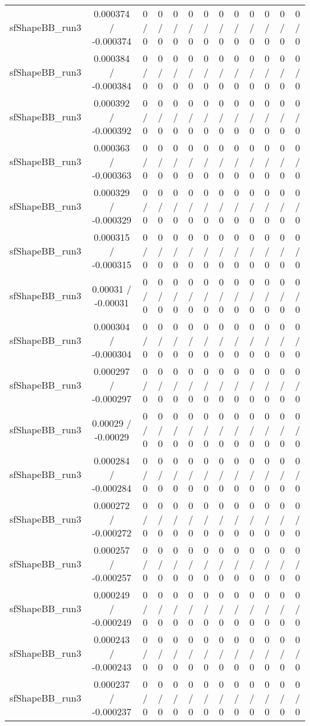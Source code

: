 \documentclass[10pt]{article}
\begin{document}
\begin{table}[htbp]
\begin{center}
\begin{tabular}{|c|c|c|c|c|c|c|c|c|c|c|c|c|}
  sfShapeBB_run3 & 0.000374 / -0.000374 & 0 / 0 & 0 / 0 & 0 / 0 & 0 / 0 & 0 / 0 & 0 / 0 & 0 / 0 & 0 / 0 & 0 / 0 & 0 / 0 & 0 / 0 \\ 
  sfShapeBB_run3 & 0.000384 / -0.000384 & 0 / 0 & 0 / 0 & 0 / 0 & 0 / 0 & 0 / 0 & 0 / 0 & 0 / 0 & 0 / 0 & 0 / 0 & 0 / 0 & 0 / 0 \\ 
  sfShapeBB_run3 & 0.000392 / -0.000392 & 0 / 0 & 0 / 0 & 0 / 0 & 0 / 0 & 0 / 0 & 0 / 0 & 0 / 0 & 0 / 0 & 0 / 0 & 0 / 0 & 0 / 0 \\ 
  sfShapeBB_run3 & 0.000363 / -0.000363 & 0 / 0 & 0 / 0 & 0 / 0 & 0 / 0 & 0 / 0 & 0 / 0 & 0 / 0 & 0 / 0 & 0 / 0 & 0 / 0 & 0 / 0 \\ 
  sfShapeBB_run3 & 0.000329 / -0.000329 & 0 / 0 & 0 / 0 & 0 / 0 & 0 / 0 & 0 / 0 & 0 / 0 & 0 / 0 & 0 / 0 & 0 / 0 & 0 / 0 & 0 / 0 \\ 
  sfShapeBB_run3 & 0.000315 / -0.000315 & 0 / 0 & 0 / 0 & 0 / 0 & 0 / 0 & 0 / 0 & 0 / 0 & 0 / 0 & 0 / 0 & 0 / 0 & 0 / 0 & 0 / 0 \\ 
  sfShapeBB_run3 & 0.00031 / -0.00031 & 0 / 0 & 0 / 0 & 0 / 0 & 0 / 0 & 0 / 0 & 0 / 0 & 0 / 0 & 0 / 0 & 0 / 0 & 0 / 0 & 0 / 0 \\ 
  sfShapeBB_run3 & 0.000304 / -0.000304 & 0 / 0 & 0 / 0 & 0 / 0 & 0 / 0 & 0 / 0 & 0 / 0 & 0 / 0 & 0 / 0 & 0 / 0 & 0 / 0 & 0 / 0 \\ 
  sfShapeBB_run3 & 0.000297 / -0.000297 & 0 / 0 & 0 / 0 & 0 / 0 & 0 / 0 & 0 / 0 & 0 / 0 & 0 / 0 & 0 / 0 & 0 / 0 & 0 / 0 & 0 / 0 \\ 
  sfShapeBB_run3 & 0.00029 / -0.00029 & 0 / 0 & 0 / 0 & 0 / 0 & 0 / 0 & 0 / 0 & 0 / 0 & 0 / 0 & 0 / 0 & 0 / 0 & 0 / 0 & 0 / 0 \\ 
  sfShapeBB_run3 & 0.000284 / -0.000284 & 0 / 0 & 0 / 0 & 0 / 0 & 0 / 0 & 0 / 0 & 0 / 0 & 0 / 0 & 0 / 0 & 0 / 0 & 0 / 0 & 0 / 0 \\ 
  sfShapeBB_run3 & 0.000272 / -0.000272 & 0 / 0 & 0 / 0 & 0 / 0 & 0 / 0 & 0 / 0 & 0 / 0 & 0 / 0 & 0 / 0 & 0 / 0 & 0 / 0 & 0 / 0 \\ 
  sfShapeBB_run3 & 0.000257 / -0.000257 & 0 / 0 & 0 / 0 & 0 / 0 & 0 / 0 & 0 / 0 & 0 / 0 & 0 / 0 & 0 / 0 & 0 / 0 & 0 / 0 & 0 / 0 \\ 
  sfShapeBB_run3 & 0.000249 / -0.000249 & 0 / 0 & 0 / 0 & 0 / 0 & 0 / 0 & 0 / 0 & 0 / 0 & 0 / 0 & 0 / 0 & 0 / 0 & 0 / 0 & 0 / 0 \\ 
  sfShapeBB_run3 & 0.000243 / -0.000243 & 0 / 0 & 0 / 0 & 0 / 0 & 0 / 0 & 0 / 0 & 0 / 0 & 0 / 0 & 0 / 0 & 0 / 0 & 0 / 0 & 0 / 0 \\ 
  sfShapeBB_run3 & 0.000237 / -0.000237 & 0 / 0 & 0 / 0 & 0 / 0 & 0 / 0 & 0 / 0 & 0 / 0 & 0 / 0 & 0 / 0 & 0 / 0 & 0 / 0 & 0 / 0 \\ 

\end{tabular}
\end{center}
\end{table}
\end{document}
